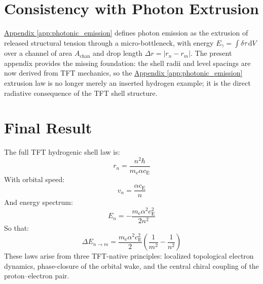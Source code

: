 \section{Consistency with Photon Extrusion}
\hyperref[app:photonic_emission]{Appendix \ref*{app:photonic_emission}} defines photon emission as the extrusion of released structural tension through a micro-bottleneck, with energy $E_{\gamma} = \int \delta\tau \, \mathrm{d}V$ over a channel of area $A_{\mathrm{chan}}$ and drop length $\Delta r = |r_n - r_m|$. The present appendix provides the missing foundation: the shell radii and level spacings are now derived from TFT mechanics, so the \hyperref[app:photonic_emission]{Appendix \ref*{app:photonic_emission}} extrusion law is no longer merely an inserted hydrogen example; it is the direct radiative consequence of the TFT shell structure.

\section{Final Result}
The full TFT hydrogenic shell law is:
\begin{equation}
    r_n = \frac{n^2 \hbar}{m_{\mathrm{e}} \alpha c_{\mathrm{E}}}
\end{equation}
With orbital speed:
\begin{equation}
    v_n = \frac{\alpha c_{\mathrm{E}}}{n}
\end{equation}
And energy spectrum:
\begin{equation}
    E_n = -\frac{m_{\mathrm{e}} \alpha^2 c_{\mathrm{E}}^2}{2n^2}
\end{equation}
So that:
\begin{equation}
    \Delta E_{n\to m} = \frac{m_{\mathrm{e}} \alpha^2 c_{\mathrm{E}}^2}{2} \left( \frac{1}{m^2} - \frac{1}{n^2} \right)
\end{equation}
These laws arise from three TFT-native principles: localized topological electron dynamics, phase-closure of the orbital wake, and the central chiral coupling of the proton--electron pair.

